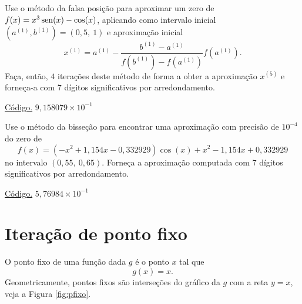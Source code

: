 \begin{exer}\label{exer:falsapos_1}
  Use o método da falsa posição para aproximar um zero de $f(x)=x^3\operatorname{sen}(x)-\cos(x)$, aplicando como intervalo inicial $(a^{(1)}, b^{(1)}) = (0,5, ~1)$ e aproximação inicial
  \begin{equation}
    x^{(1)} = a^{(1)} - \frac{b^{(1)}-a^{(1)}}{f(b^{(1)})-f(a^{(1)})}f(a^{(1)}).
  \end{equation}
Faça, então, $4$ iterações deste método de forma a obter a aproximação $x^{(5)}$ e forneça-a com $7$ dígitos significativos por arredondamento.
\end{exer}
\begin{resp}
    \ifisoctave 
  \href{https://github.com/phkonzen/notas/blob/master/src/MatematicaNumerica/cap_eq1d/dados/exer_falsapos_1/exer_falsapos_1.m}{Código.} 
  \fi
  $9,158079\times 10^{-1}$
\end{resp}

\begin{exer}\label{exer:falsapos_multpar}
  Use o método da bisseção para encontrar uma aproximação com precisão de $10^{-4}$ do zero de
  \begin{equation}
    f(x) = (-x^2+1,154x-0,332929)\cos(x) + x^2 - 1,154x + 0,332929
  \end{equation}
no intervalo $(0,55, ~0,65)$. Forneça a aproximação computada com $7$ dígitos significativos por arredondamento.
\end{exer}
\begin{resp}
    \ifisoctave 
  \href{https://github.com/phkonzen/notas/blob/master/src/MatematicaNumerica/cap_eq1d/dados/exer_falsapos_multpar/exer_falsapos_multpar.m}{Código.} 
  \fi
  $5,76984\times 10^{-1}$
\end{resp}

\section{Iteração de ponto fixo}\label{cap_eq1d_pfixo}

O ponto fixo de uma função dada $g$ é o ponto $x$ tal que
\begin{equation}
  g(x) = x.
\end{equation}
Geometricamente, pontos fixos são interseções do gráfico da $g$ com a reta $y=x$, veja a Figura \ref{fig:pfixo}.

